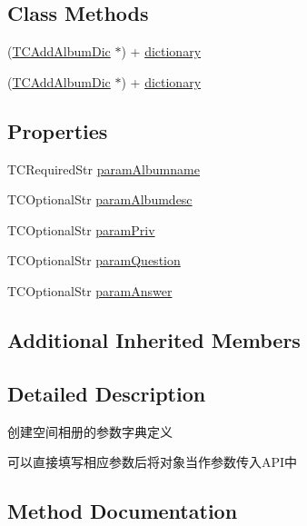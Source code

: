 \subsection*{Class Methods}
\begin{DoxyCompactItemize}
\item 
(\mbox{\hyperlink{interface_t_c_add_album_dic}{T\+C\+Add\+Album\+Dic}} $\ast$) + \mbox{\hyperlink{interface_t_c_add_album_dic_a4b8ff75155d90460265eb375106d0c3e}{dictionary}}
\item 
(\mbox{\hyperlink{interface_t_c_add_album_dic}{T\+C\+Add\+Album\+Dic}} $\ast$) + \mbox{\hyperlink{interface_t_c_add_album_dic_a4b8ff75155d90460265eb375106d0c3e}{dictionary}}
\end{DoxyCompactItemize}
\subsection*{Properties}
\begin{DoxyCompactItemize}
\item 
T\+C\+Required\+Str \mbox{\hyperlink{interface_t_c_add_album_dic_a019553addbdbb68529e7772ea8bb7e20}{param\+Albumname}}
\item 
T\+C\+Optional\+Str \mbox{\hyperlink{interface_t_c_add_album_dic_a29c5ee5de3c66e786658c5f90b2af24d}{param\+Albumdesc}}
\item 
T\+C\+Optional\+Str \mbox{\hyperlink{interface_t_c_add_album_dic_afc06b0f97fc208c7eabf504eddc5b7be}{param\+Priv}}
\item 
T\+C\+Optional\+Str \mbox{\hyperlink{interface_t_c_add_album_dic_a3231e7f93290532c98fe6704d4c5b1ea}{param\+Question}}
\item 
T\+C\+Optional\+Str \mbox{\hyperlink{interface_t_c_add_album_dic_a75dd99f5052178eeab9b495f918675ba}{param\+Answer}}
\end{DoxyCompactItemize}
\subsection*{Additional Inherited Members}


\subsection{Detailed Description}
创建空间相册的参数字典定义 

可以直接填写相应参数后将对象当作参数传入\+A\+P\+I中 

\subsection{Method Documentation}
\mbox{\label{interface_t_c_add_album_dic_a4b8ff75155d90460265eb375106d0c3e}} 
